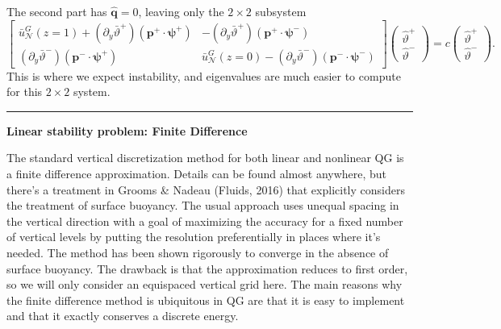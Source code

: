 \documentclass[10pt]{article}
\newcommand{\pd}[1]{\partial_{#1}}
\newcommand{\sN}{\mathcal{N}}
\begin{document}
The second part has $\hat{\bm{q}} = 0$, leaving only the $2\times 2$ subsystem
\begin{equation}
\left[\begin{array}{cc}
\bar{u}_\sN^G(z=1)+(\pd{y}\bar\vartheta^+)(\bm{p}^+\cdot\bm{\psi}^+) & -(\pd{y}\bar\vartheta^+)(\bm{p}^+\cdot\bm{\psi}^-)\\
 (\pd{y}\bar\vartheta^-)(\bm{p}^-\cdot\bm{\psi}^+)&\bar{u}_\sN^G(z=0)-(\pd{y}\bar\vartheta^-)(\bm{p}^-\cdot\bm{\psi}^-)
\end{array}\right]\left(\begin{array}{c}\hat{\vartheta}^+\\\hat{\vartheta}^-\end{array}\right) = c\left(\begin{array}{c}\hat{\vartheta}^+\\\hat{\vartheta}^-\end{array}\right).
\end{equation}
This is where we expect instability, and eigenvalues are much easier to compute for this $2\times2$ system.

\clearpage
\hrule
\begin{center}{\bf Linear stability problem: Finite Difference}\end{center}
The standard vertical discretization method for both linear and nonlinear QG is a finite difference approximation.
Details can be found almost anywhere, but there's a treatment in Grooms \& Nadeau (Fluids, 2016) that explicitly considers the treatment of surface buoyancy.
The usual approach uses unequal spacing in the vertical direction with a goal of maximizing the accuracy for a fixed number of vertical levels by putting the resolution preferentially in places where it's needed.
The method has been shown rigorously to converge in the absence of surface buoyancy.
The drawback is that the approximation reduces to first order, so we will only consider an equispaced vertical grid here.
The main reasons why the finite difference method is ubiquitous in QG are that it is easy to implement and that it exactly conserves a discrete energy.
\end{document}
